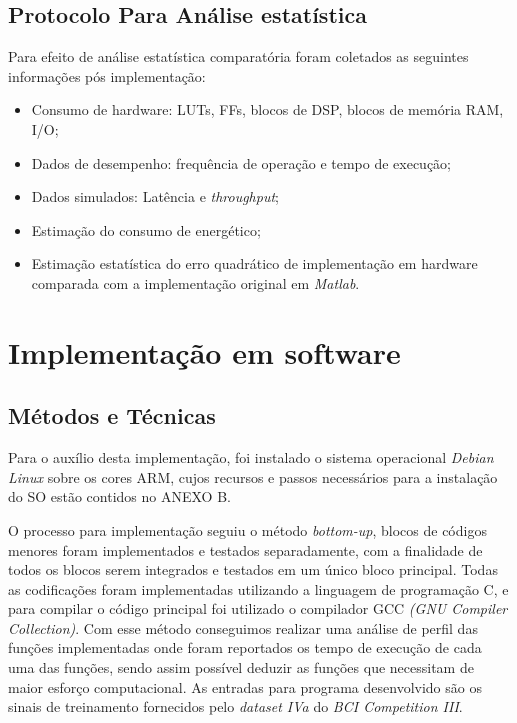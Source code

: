 \subsection{Protocolo Para Análise estatística}
Para efeito de análise estatística comparatória foram coletados as seguintes informações pós implementação:

\begin{itemize}[noitemsep]
	\item Consumo de hardware: LUTs, FFs, blocos de DSP, blocos de memória RAM, I/O;
	\item Dados de desempenho: frequência de operação e tempo de execução;
	\item Dados simulados: Latência e \textit{throughput};
	\item Estimação do consumo de energético;
	\item Estimação estatística do erro quadrático de implementação em hardware comparada com a implementação original em \textit{Matlab}.
\end{itemize}

\section{Implementação em software}

\subsection{Métodos e Técnicas}
Para o auxílio desta implementação, foi instalado o sistema operacional \textit{Debian Linux} sobre os cores ARM, cujos recursos e passos necessários
para a instalação do SO estão contidos no ANEXO B.

O processo para implementação seguiu o método \textit{bottom-up}, blocos de códigos menores foram implementados e testados separadamente, com a finalidade de todos os blocos serem integrados e testados em um único bloco principal. Todas as codificações foram implementadas utilizando a linguagem de programação C, e para compilar o código principal foi utilizado o compilador GCC \textit{(GNU Compiler Collection)}. Com esse método conseguimos realizar uma análise de perfil das funções implementadas onde foram reportados os tempo de execução de cada uma das funções, sendo assim possível deduzir as funções que necessitam de maior esforço computacional. As entradas para programa desenvolvido são os sinais de treinamento fornecidos pelo \textit{dataset IVa} do \textit{BCI Competition III}.

